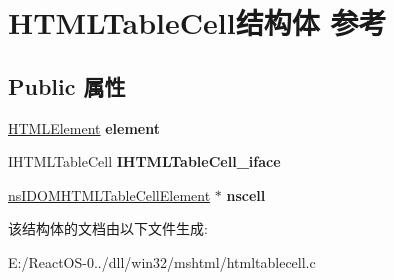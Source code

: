 \hypertarget{struct_h_t_m_l_table_cell}{}\section{H\+T\+M\+L\+Table\+Cell结构体 参考}
\label{struct_h_t_m_l_table_cell}
\subsection*{Public 属性}
\begin{DoxyCompactItemize}
\item 
\mbox{\label{struct_h_t_m_l_table_cell_a2d4327332c6348847afdac97751ebdc9}} 
\hyperlink{struct_h_t_m_l_element}{H\+T\+M\+L\+Element} {\bfseries element}
\item 
\mbox{\label{struct_h_t_m_l_table_cell_a5eeab61643544ff990ca39068c1c4fe9}} 
I\+H\+T\+M\+L\+Table\+Cell {\bfseries I\+H\+T\+M\+L\+Table\+Cell\+\_\+iface}
\item 
\mbox{\label{struct_h_t_m_l_table_cell_a852b01f452050e1df793efe2a804fa3b}} 
\hyperlink{interfacens_i_d_o_m_h_t_m_l_table_cell_element}{ns\+I\+D\+O\+M\+H\+T\+M\+L\+Table\+Cell\+Element} $\ast$ {\bfseries nscell}
\end{DoxyCompactItemize}


该结构体的文档由以下文件生成\+:\begin{DoxyCompactItemize}
\item 
E\+:/\+React\+O\+S-\/0../dll/win32/mshtml/htmltablecell.\+c\end{DoxyCompactItemize}
